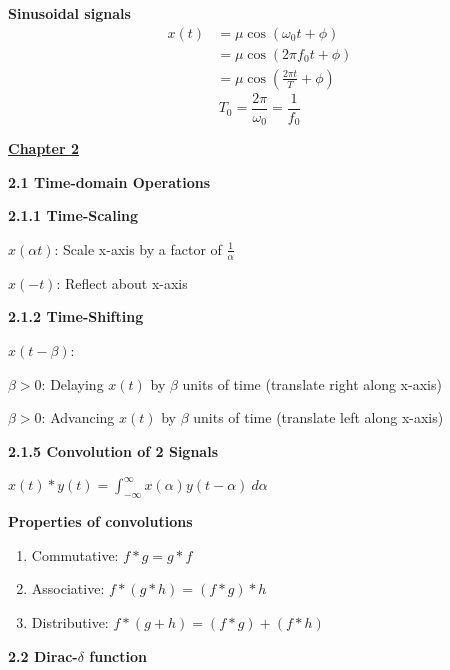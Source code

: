\documentclass[landscape,a4paper]{extarticle}
\newenvironment{Figure}
  {\par\medskip\noindent\minipage{\linewidth}}
  {\endminipage\par\medskip}
\begin{document}
\begin{multicols*}{5}
\begin{Figure}
    \end{Figure}
    \textbf{Sinusoidal signals}
    \begin{align*}
        x(t)&=\mu \cos(\omega_0t+\phi)\\
        &= \mu\cos(2\pi f_0t + \phi)\\
        &= \mu\cos(\frac{2\pi t}{T} + \phi)
    \end{align*} \newline
    \[
        T_0=\frac{2\pi}{\omega_0}=\frac{1}{f_0}
    \]

    \textbf{\uline{Chapter 2}}

    \textbf{2.1 Time-domain Operations}

    \textbf{2.1.1 Time-Scaling}

    $x(\alpha t)$: Scale x-axis by a factor of $\frac{1}{\alpha}$

    $x(-t)$: Reflect about x-axis

    \textbf{2.1.2 Time-Shifting}

    $x(t-\beta)$:

    $\beta > 0$: Delaying $x(t)$ by $\beta$ units of time (translate right along x-axis)

    $\beta > 0$: Advancing $x(t)$ by $\beta$ units of time (translate left along x-axis)

    \textbf{2.1.5 Convolution of 2 Signals}

    $x(t)*y(t)=\int_{-\infty}^{\infty}x(\alpha)y(t-\alpha)\ d\alpha$

    \textbf{Properties of convolutions}
    \begin{enumerate}
        \item Commutative: $f * g = g * f$
        \item Associative: $f * (g * h) = (f * g) * h$
        \item Distributive: $f * (g + h) = (f * g) + (f * h)$
    \end{enumerate}

    \textbf{2.2 Dirac-$\delta$ function}


\end{multicols*}
\end{document}
